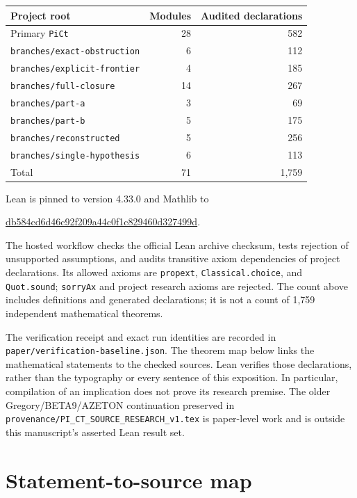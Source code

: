 \documentclass[11pt,a4paper]{article}
\theoremstyle{definition}
\theoremstyle{remark}
\newcommand{\code}[1]{{\small\nolinkurl{#1}}}
\begin{document}
\begin{center}
\begin{tabular}{lrr}
\toprule
Project root & Modules & Audited declarations\\
\midrule
Primary \code{PiCt} & 28 & 582\\
\code{branches/exact-obstruction} & 6 & 112\\
\code{branches/explicit-frontier} & 4 & 185\\
\code{branches/full-closure} & 14 & 267\\
\code{branches/part-a} & 3 & 69\\
\code{branches/part-b} & 5 & 175\\
\code{branches/reconstructed} & 5 & 256\\
\code{branches/single-hypothesis} & 6 & 113\\
\midrule
Total & 71 & 1,759\\
\bottomrule
\end{tabular}
\end{center}

Lean is pinned to version 4.33.0 and Mathlib to
\begin{center}\small\url{db584cd6d46c92f209a44c0f1c829460d327499d}.\end{center}
The hosted workflow checks the official Lean archive checksum, tests
rejection of unsupported assumptions, and audits transitive axiom
dependencies of project declarations. Its allowed axioms are
\code{propext}, \code{Classical.choice}, and \code{Quot.sound};
\code{sorryAx} and project research axioms are rejected.
The count above includes definitions and generated declarations;
it is not a count of 1,759 independent mathematical theorems.

The verification receipt and exact run identities are recorded in
\code{paper/verification-baseline.json}. The theorem map below links
the mathematical statements to the checked sources. Lean verifies
those declarations, rather than the typography or every sentence
of this exposition. In particular, compilation of an implication
does not prove its research premise.
The older Gregory/BETA9/AZETON continuation preserved in
\code{provenance/PI_CT_SOURCE_RESEARCH_v1.tex} is paper-level work
and is outside this manuscript's asserted Lean result set.

\appendix
\section{Statement-to-source map}
\label{sec:map}
\end{document}
